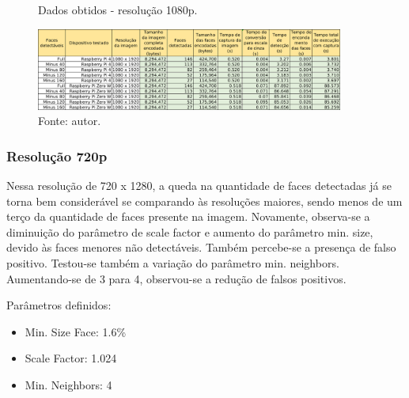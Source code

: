 \begin{figure}[H]
    \centering
    \caption[Dados obtidos - resolução 1080p.]{Dados obtidos - resolução 1080p.}
    \includegraphics[width=0.90\textwidth]{Cap4_Experimentos_Realizados/Figures/cena1_dados_1080p_br.jpg}
    \caption*{Fonte: autor.}
    \label{fig:dadosCena1_1080p}
\end{figure}

\subsubsection{Resolução 720p} \label{sssec:resolution1-3}

Nessa resolução de 720 x 1280, a queda na quantidade de faces detectadas já se torna bem considerável se comparando às resoluções maiores, sendo menos de um terço da quantidade de faces presente na imagem. Novamente, observa-se a diminuição do parâmetro de scale factor e aumento do parâmetro min. size, devido às faces menores não detectáveis.
Também percebe-se a presença de falso positivo. Testou-se também a variação do parâmetro min. neighbors. Aumentando-se de 3 para 4, observou-se a redução de falsos positivos.

Parâmetros definidos: 
\begin{itemize}
    \SingleSpacing
    \item Min. Size Face: 1.6\%
    \item Scale Factor: 1.024
    \item Min. Neighbors: 4
\end{itemize}

